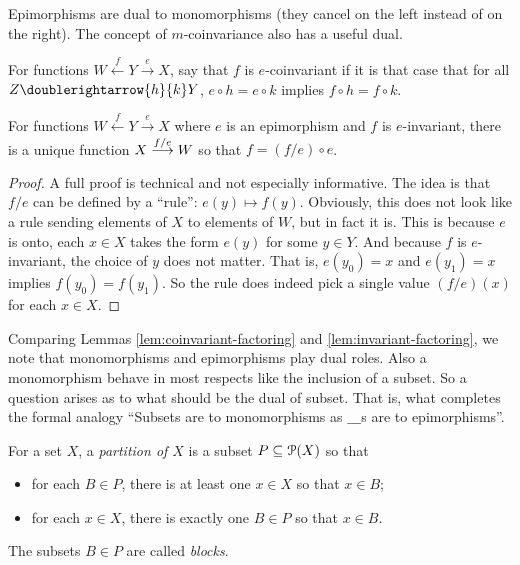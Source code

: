 Epimorphisms are dual to monomorphisms (they cancel on the left instead of on the right). The concept of $m$-coinvariance also has a useful dual.

\begin{defn}
	For functions $W\stackrel{f}{\longleftarrow}Y\stackrel{e}{\longrightarrow}X$, say that $f$ is {$e$-coinvariant} if it is that case that for all $Z\doublerightarrow{h}{k}Y$, $e\circ h=e\circ k$ implies $f\circ h = f\circ k$.
\end{defn}

\begin{lemma}\label{lem:invariant-factoring}
	For functions $W\stackrel{f}{\longleftarrow}Y\stackrel{e}{\longrightarrow}X$ where $e$ is an epimorphism and $f$ is $e$-invariant, there is a unique function $\sfromto {f/e}XW$ so that $f = (f/e)\circ e$.
	
	\begin{proof}
		A full proof is technical and not especially informative. 
		The idea is that $f/e$ can be defined by a ``rule'': $e(y) \mapsto f(y)$. 
		Obviously, this does not look like a rule sending elements of $X$ to elements of $W$, but in fact it is. 
		This is because $e$ is onto, each $x\in X$ takes the form $e(y)$ for some $y\in Y$. 
		And because $f$ is $e$-invariant, the choice of $y$ does not matter. That is, $e(y_0)=x$ and $e(y_1)=x$ implies $f(y_0)=f(y_1)$.
		So the rule does indeed pick a single value $(f/e)(x)$ for each $x\in X$.  
	\end{proof}
\end{lemma}

Comparing Lemmas \ref{lem:coinvariant-factoring} and \ref{lem:invariant-factoring}, we note that monomorphisms and epimorphisms play dual roles. Also a monomorphism behave in most respects like the inclusion of a subset. So a question arises as to what should be the dual of subset. That is, what completes the formal analogy ``Subsets are to monomorphisms as $\_\_\_$s are to epimorphisms''. 

\begin{defn}
	For a set $X$, a \emph{partition of $X$} is a subset $P\subseteq \powerset(X)$ so that
	\begin{itemize}
		\item for each $B\in P$, there is at least one $x\in X$ so that $x\in B$;
		\item for each $x\in X$, there is exactly one $B\in P$ so that $x\in B$.
	\end{itemize}
	The subsets $B\in P$ are called \emph{blocks}.
\end{defn}


